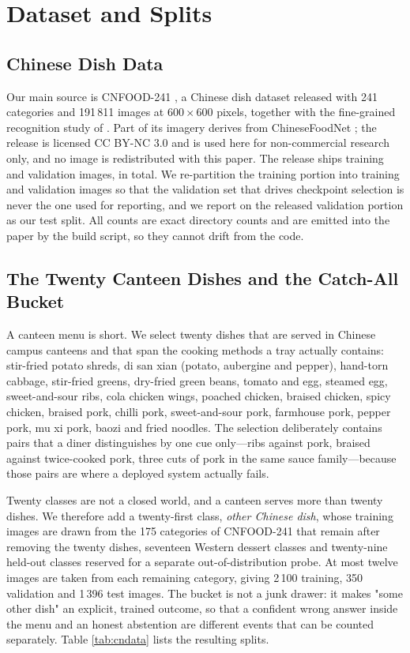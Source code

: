 \section{Dataset and Splits}
\label{sec:data}
\subsection{Chinese Dish Data}
Our main source is CNFOOD-241 \cite{cnfood241}, a Chinese dish dataset released
with 241 categories and 191\,811 images at $600\times600$ pixels, together with
the fine-grained recognition study of \cite{xiong2026cnfood}. Part of its imagery
derives from ChineseFoodNet \cite{chen2017chinesefoodnet}; the release is
licensed CC BY-NC 3.0 and is used here for non-commercial research only, and no
image is redistributed with this paper. The release ships \cnPrePoolN{} training and
\cnPreTestN{} validation images, \cnAllN{} in total. We re-partition the training
portion into
\cnPreTrainN{} training and \cnPreValN{} validation images so that the validation
set that drives checkpoint selection is never the one used for reporting, and we
report on the released validation portion as our test split. All counts are exact directory counts and are emitted
into the paper by the build script, so they cannot drift from the code.

\subsection{The Twenty Canteen Dishes and the Catch-All Bucket}
A canteen menu is short. We select twenty dishes that are served in Chinese
campus canteens and that span the cooking methods a tray actually contains:
stir-fried potato shreds, di san xian (potato, aubergine and pepper), hand-torn
cabbage, stir-fried greens, dry-fried green beans, tomato and egg, steamed egg,
sweet-and-sour ribs, cola chicken wings, poached chicken, braised chicken, spicy
chicken, braised pork, chilli pork, sweet-and-sour pork, farmhouse pork, pepper
pork, mu xi pork, baozi and fried noodles. The selection deliberately contains
pairs that a diner distinguishes by one cue only---ribs against pork, braised
against twice-cooked pork, three cuts of pork in the same sauce family---because
those pairs are where a deployed system actually fails.

Twenty classes are not a closed world, and a canteen serves more than twenty
dishes. We therefore add a twenty-first class, \emph{other Chinese dish}, whose
training images are drawn from the 175 categories of CNFOOD-241 that remain after
removing the twenty dishes, seventeen Western dessert classes and twenty-nine
held-out classes reserved for a separate out-of-distribution probe. At most
twelve images are taken from each remaining category, giving 2\,100 training,
350 validation and 1\,396 test images. The bucket is not a junk drawer: it makes
"some other dish" an explicit, trained outcome, so that a confident wrong answer
inside the menu and an honest abstention are different events that can be counted
separately. Table \ref{tab:cndata} lists the resulting splits.

